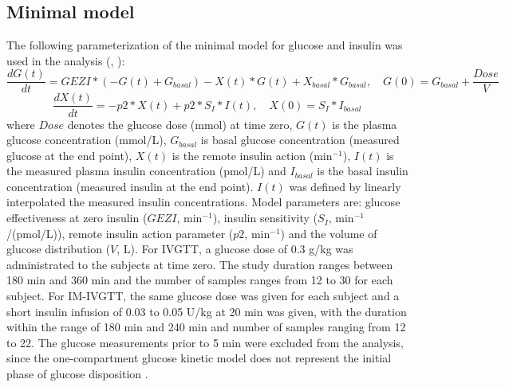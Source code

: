 \documentclass[utf8]{frontiersSCNS} %
\begin{document}
\subsection{Minimal model}
The following parameterization of the minimal model for glucose and insulin was used in the analysis (\citet{Bergman1979}, \citet{Araujo-vilar1998}):
\begin{equation}
\frac{dG(t)}{dt} =GEZI*(-G(t)+G_{basal})-X(t)*G(t)+X_{basal}*G_{basal}, \quad G(0) =G_{basal}+\frac{Dose}{V}\label{eq:01}
\end{equation}
\begin{equation}
\frac{dX(t)}{dt} =-p2*X(t)+p2*S_I*I(t), \quad X(0) =S_I*I_{basal}\label{eq:02}
\end{equation}
where $Dose$ denotes the glucose dose (mmol) at time zero, $G(t)$ is the plasma glucose concentration (mmol/L), $G_{basal}$ is basal glucose concentration (measured glucose at the end point), $X(t)$ is the remote insulin action (min$^{-1}$), $I(t)$ is the measured plasma insulin concentration (pmol/L) and $I_{basal}$ is the basal insulin concentration (measured insulin at the end point). $I(t)$ was defined by linearly interpolated the measured insulin concentrations. Model parameters are: glucose effectiveness at zero insulin ($GEZI$, min$^{-1}$), insulin sensitivity ($S_I$, min$^{-1}$/(pmol/L)), remote insulin action parameter ($p2$, min$^{-1}$) and the volume of glucose distribution ($V$, L). For IVGTT, a glucose dose of 0.3 g/kg was administrated to the subjects at time zero. The study duration ranges between 180 min and 360 min and the number of samples ranges from 12 to 30 for each subject. For IM-IVGTT, the same glucose dose was given for each subject and a short insulin infusion of 0.03 to 0.05 U/kg at 20 min was given, with the duration within the range of 180 min and 240 min and number of samples ranging from 12 to 22. The glucose measurements prior to 5 min were excluded from the analysis, since the one-compartment glucose kinetic model does not represent the initial phase of glucose disposition  \citep{Vicini1999}.

\vskip 0.5cm
\end{document}
